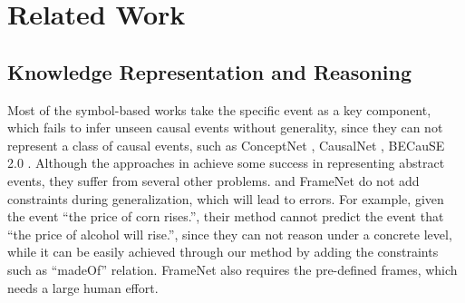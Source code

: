 \section{Related Work}
\label{sec:related}
\subsection{Knowledge Representation and Reasoning}
Most of the symbol-based works take the specific event as a key component, which fails to infer unseen causal events without generality, since they can not represent a class of causal events, such as ConceptNet \cite{Speer2016}, CausalNet \cite{Luo2016a}, BECauSE 2.0 \cite{Dunietz2017}.
Although the approaches in \cite{Zhao2017,Baker1997,Radinsky2012} achieve some success in representing abstract events, they suffer from several other problems.
\cite{Zhao2017} and FrameNet \cite{Baker1997} do not add constraints during generalization, which will lead to errors. 
For example, given the event ``the price of corn rises.'', their method cannot predict the event that ``the price of alcohol will rise.'', since they can not reason under a concrete level, while it can be easily achieved through our method by adding the constraints such as ``madeOf'' relation. 
FrameNet also requires the pre-defined frames, which needs a large human effort.
